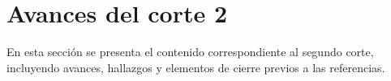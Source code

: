 \section{Avances del corte 2}

En esta sección se presenta el contenido correspondiente al segundo corte,
incluyendo avances, hallazgos y elementos de cierre previos a las referencias.
